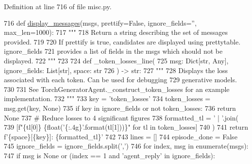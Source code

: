 Definition at line 716 of file misc.\+py.


\begin{DoxyCode}
716 \textcolor{keyword}{def }\hyperlink{namespaceparlai_1_1utils_1_1misc_a146f303a4c4b34993458968c74b55d2f}{display\_messages}(msgs, prettify=False, ignore\_fields='', max\_len=1000):
717     \textcolor{stringliteral}{"""}
718 \textcolor{stringliteral}{    Return a string describing the set of messages provided.}
719 \textcolor{stringliteral}{}
720 \textcolor{stringliteral}{    If prettify is true, candidates are displayed using prettytable. ignore\_fields}
721 \textcolor{stringliteral}{    provides a list of fields in the msgs which should not be displayed.}
722 \textcolor{stringliteral}{    """}
723 
724     \textcolor{keyword}{def }\_token\_losses\_line(
725         msg: Dict[str, Any], ignore\_fields: List[str], space: str
726     ) -> str:
727         \textcolor{stringliteral}{"""}
728 \textcolor{stringliteral}{        Displays the loss associated with each token. Can be used for debugging}
729 \textcolor{stringliteral}{        generative models.}
730 \textcolor{stringliteral}{}
731 \textcolor{stringliteral}{        See TorchGeneratorAgent.\_construct\_token\_losses for an example implementation.}
732 \textcolor{stringliteral}{        """}
733         key = \textcolor{stringliteral}{'token\_losses'}
734         token\_losses = msg.get(key, \textcolor{keywordtype}{None})
735         \textcolor{keywordflow}{if} key \textcolor{keywordflow}{in} ignore\_fields \textcolor{keywordflow}{or} \textcolor{keywordflow}{not} token\_losses:
736             \textcolor{keywordflow}{return} \textcolor{keywordtype}{None}
737         \textcolor{comment}{# Reduce losses to 4 significant figures}
738         formatted\_tl = \textcolor{stringliteral}{' | '}.join(
739             [f\textcolor{stringliteral}{"\{tl[0]\} \{float('\{:.4g\}'.format(tl[1]))\}"} \textcolor{keywordflow}{for} tl \textcolor{keywordflow}{in} token\_losses]
740         )
741         \textcolor{keywordflow}{return} f\textcolor{stringliteral}{'\{space\}[\{key\}]: \{formatted\_tl\}'}
742 
743     lines = []
744     episode\_done = \textcolor{keyword}{False}
745     ignore\_fields = ignore\_fields.split(\textcolor{stringliteral}{','})
746     \textcolor{keywordflow}{for} index, msg \textcolor{keywordflow}{in} enumerate(msgs):
747         \textcolor{keywordflow}{if} msg \textcolor{keywordflow}{is} \textcolor{keywordtype}{None} \textcolor{keywordflow}{or} (index == 1 \textcolor{keywordflow}{and} \textcolor{stringliteral}{'agent\_reply'} \textcolor{keywordflow}{in} ignore\_fields):

\end{DoxyCode}
